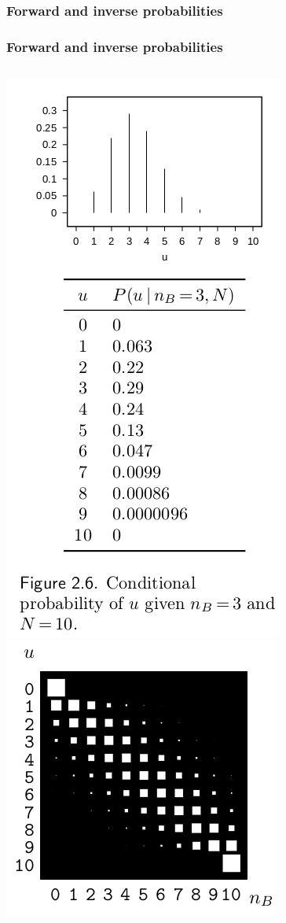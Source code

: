 \documentclass{beamer}
\begin{document}
\begin{frame}
	\frametitle{Forward and inverse probabilities}

\end{frame}


\begin{frame}
	\frametitle{Forward and inverse probabilities}
	\begin{columns}
   \includegraphics[width=.7\textwidth]{e7}
   \includegraphics[width=.8\textwidth]{e8}
  \end{columns}
\end{frame}
\end{document}
